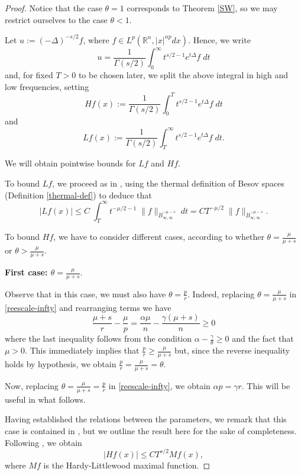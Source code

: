\documentclass[12pt]{amsart}
\newcommand {\R}{\mathbb{R}}
\newcommand {\be}{\begin{equation}}
\newcommand {\ee}{\end{equation}}
\begin{document}
\begin{proof}

Notice that the case $\theta=1$ corresponds to Theorem \ref{SW}, so we may restrict ourselves to the case $\theta<1$.

Let $ u := (-\Delta)^{-s/2} f$, where $f \in L^p(\R^n,|x|^{\alpha p}dx)$. Hence, we write
$$ u =  \frac{1}{\Gamma(s/2)} \int_{0}^\infty t^{s/2-1} e^{t\Delta} f \; dt  $$
and, for fixed $T>0$ to be chosen later, we split the above integral in high and low frequencies, setting
$$ Hf(x) := \frac{1}{\Gamma(s/2)} \int_{0}^T t^{s/2-1} e^{t\Delta} f
\; dt $$
and 
$$ Lf(x) := \frac{1}{\Gamma(s/2)} \int_{T}^\infty t^{s/2-1} e^{t\Delta} f
\; dt.$$


We will obtain pointwise bounds for $Lf$ and $Hf$.

To bound $Lf$, we proceed as in \cite{Ch}, using the thermal definition of Besov spaces (Definition \ref{thermal-def})
 to deduce that 
\be
\label{cota-Lf}
|Lf(x)| \leq C \; \int_T^\infty t^{-\mu/2-1} \; 
 \| f \|_{\dot{B}^{-\mu-s}_{\infty, \infty}} \; dt = 
C T^{-\mu/2} \;  \| f \|_{\dot{B}^{-\mu-s}_{\infty,\infty}} .
\ee

\;

To bound $Hf$, we have to consider different cases, according to whether $\theta=\frac{\mu}{\mu+s}$ or $\theta>\frac{\mu}{\mu+s}$.

\;

{\bf First case: $\theta=\frac{\mu}{\mu+s}.$}

Observe that in this case, we must also have $\theta=\frac{p}{r}$. Indeed, replacing   $\theta=\frac{\mu}{\mu+s}$ in \eqref{reescale-infty} and rearranging terms we have
$$
\frac{\mu+s}{r}-\frac{\mu}{p}=\frac{\alpha \mu}{n} -\frac{\gamma (\mu+s)}{n} \ge 0
$$
where the last inequality follows from the condition $\alpha-\frac{\gamma}{\theta}\ge 0$ and the fact that $\mu >0$. This immediately implies that $\frac{p}{r}\ge \frac{\mu}{\mu+s}$ but, since the reverse inequality holds by hypothesis, we obtain $\frac{p}{r}= \frac{\mu}{\mu+s}=\theta$.

Now, replacing $\theta=\frac{\mu}{\mu+s}=\frac{p}{r}$ in  \eqref{reescale-infty}, we obtain $\alpha p =\gamma r$. This will be useful in what follows.


Having established the relations between the parameters, we remark that this case is contained in \cite[Annexe C]{Ch}, but we outline the result here for the sake of completeness. Following  \cite{Ch}, we obtain
\be
\label{cota-Hf-limite}
|Hf(x)|\le C T^{s/2} Mf(x),
\ee
 where $Mf$ is the Hardy-Littlewood maximal function. 
 

\end{proof}
\end{document}
